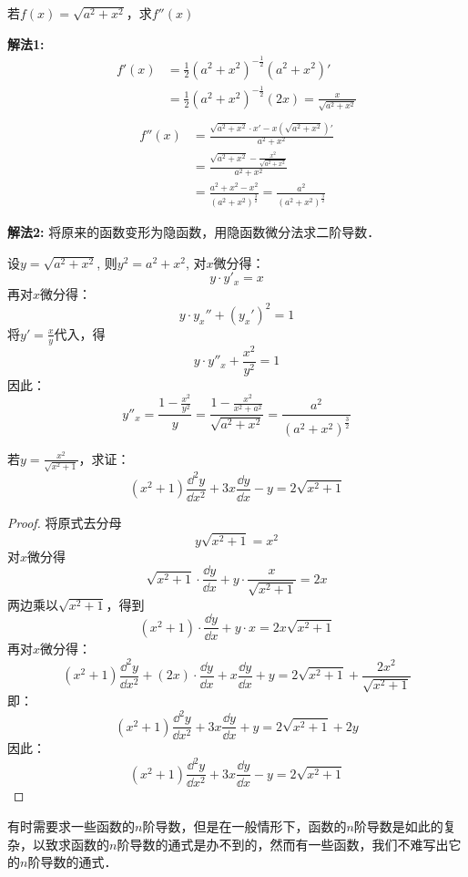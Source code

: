 \begin{example}
若$f(x)=\sqrt{a^2+x^2}$，求$f''(x)$
\end{example}


\begin{solution}
\textbf{解法1: }
\begin{align*}
    f'(x)&=\frac{1}{2}(a^2+x^2)^{-\tfrac{1}{2}}(a^2+x^2)'\\
    &=\frac{1}{2}(a^2+x^2)^{-\tfrac{1}{2}}(2x)=\frac{x}{\sqrt{a^2+x^2}}\\
\end{align*}
\begin{align*}
f''(x)&=\frac{\sqrt{a^2+x^2}\cdot x'-x\left(\sqrt{a^2+x^2}\right)'}{a^2+x^2}\\
&=\frac{\sqrt{a^2+x^2}-\frac{x^2}{\sqrt{a^2+x^2}}}{{a^2+x^2}}\\
&=\frac{a^2+x^2-x^2}{(a^2+x^2)^{\tfrac{3}{2}}}=\frac{a^2}{(a^2+x^2)^{\tfrac{3}{2}}}
\end{align*}

\textbf{解法2: } 将原来的函数变形为隐函数，用隐函数微分法求二阶导数．

设$y=\sqrt{a^2+x^2}$, 则$y^2=a^2+x^2$, 对$x$微分得：
\[y\cdot y'_x=x\]    
再对$x$微分得：
\[y\cdot y_x''+(y_x')^2=1\]
将$y'=\frac{x}{y}$代入，得
\[y\cdot y''_x+\frac{x^2}{y^2}=1\]
因此：
\[y''_x=\frac{1-\frac{x^2}{y^2}}{y}=\frac{1-\frac{x^2}{x^2+a^2}}{\sqrt{a^2+x^2}}=\frac{a^2}{(a^2+x^2)^{\tfrac{3}{2}}}\]
\end{solution}

\begin{example}
    若$y=\frac{x^2}{\sqrt{x^2+1}}$，求证：
\[(x^2+1)\frac{\dd^2 y}{\dd x^2}+3x\frac{\dd y}{\dd x}-y=2\sqrt{x^2+1}\]
\end{example}

\begin{proof}
将原式去分母
\[y\sqrt{x^2+1}=x^2\]
对$x$微分得
\[\sqrt{x^2+1}\cdot\frac{\dd y}{\dd x}+y\cdot \frac{x}{\sqrt{x^2+1}}=2x\]
两边乘以$\sqrt{x^2+1}$，得到
\[(x^2+1)\cdot \frac{\dd y}{\dd x}+y\cdot x=2x\sqrt{x^2+1}\]
再对$x$微分得：
\[(x^2+1)\frac{\dd^2 y}{\dd x^2}+(2x)\cdot \frac{\dd y}{\dd x}+x\frac{\dd y}{\dd x}+y=2\sqrt{x^2+1}+\frac{2x^2}{\sqrt{x^2+1}}\]
即：
\[(x^2+1)\frac{\dd^2 y}{\dd x^2}+3x\frac{\dd y}{\dd x}+y=2\sqrt{x^2+1}+2y\]
因此：
\[(x^2+1)\frac{\dd^2 y}{\dd x^2}+3x\frac{\dd y}{\dd x}-y=2\sqrt{x^2+1}\]
\end{proof}

有时需要求一些函数的$n$阶导数，但是在一般情形下，函数的$n$阶导数是如此的复杂，以致求函数的$n$阶导数的通式是办不到的，然而有一些函数，我们不难写出它的$n$阶导数的通式．

